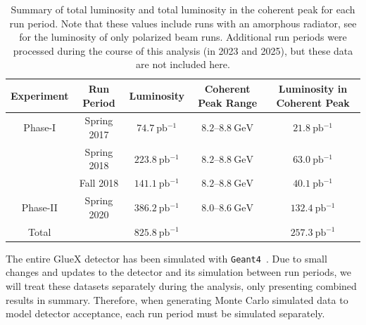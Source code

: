 \begin{table}
  \begin{center}
    \begin{tabular}{ccccc}\toprule
      Experiment & Run Period & Luminosity & Coherent Peak Range & Luminosity in Coherent Peak \\\midrule
      Phase-I & Spring 2017 & $\SI{74.7}{\pico\barn^{-1}}$ & $8.2$--$\SI{8.8}{\giga\eV}$ & $\SI{21.8}{\pico\barn^{-1}}$ \\
              & Spring 2018 & $\SI{223.8}{\pico\barn^{-1}}$ & $8.2$--$\SI{8.8}{\giga\eV}$ & $\SI{63.0}{\pico\barn^{-1}}$ \\
              & Fall 2018 & $\SI{141.1}{\pico\barn^{-1}}$ & $8.2$--$\SI{8.8}{\giga\eV}$ & $\SI{40.1}{\pico\barn^{-1}}$ \\\midrule
      Phase-II & Spring 2020 & $\SI{386.2}{\pico\barn^{-1}}$ & $8.0$--$\SI{8.6}{\giga\eV}$ & $\SI{132.4}{\pico\barn^{-1}}$ \\\midrule
      Total & & $\SI{825.8}{\pico\barn^{-1}}$ & & $\SI{257.3}{\pico\barn^{-1}}$ \\\bottomrule
    \end{tabular}
    \caption{Summary of total luminosity and total luminosity in the coherent peak for each run period. Note that these values include runs with an amorphous radiator, see  for the luminosity of only polarized beam runs. Additional run periods were processed during the course of this analysis (in 2023 and 2025), but these data are not included here.}\label{tab:run-info}
  \end{center}
\end{table}

The entire GlueX detector has been simulated with \texttt{Geant4}~\cite{Allison2006,Allison2016,Agostinelli2003}. Due to small changes and updates to the detector and its simulation between run periods, we will treat these datasets separately during the analysis, only presenting combined results in summary. Therefore, when generating Monte Carlo simulated data to model detector acceptance, each run period must be simulated separately.
